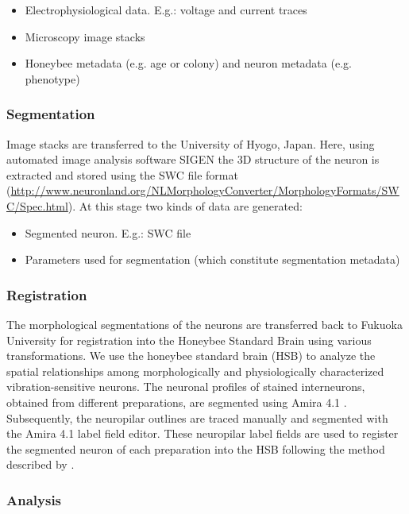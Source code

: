 \documentclass{frontiersSCNS} %
\begin{document}
\begin{itemize}
\item Electrophysiological data. E.g.: voltage and current traces
\item Microscopy image stacks
\item Honeybee metadata (e.g. age or colony) and neuron metadata (e.g.
    phenotype)
\end{itemize}

\subsubsection{Segmentation}

Image stacks are transferred to the University of Hyogo, Japan. Here, using
automated image analysis software SIGEN \citep{Yamasaki2006, Minemoto} the 3D
structure of the neuron is extracted and stored using the SWC file format
(\url{http://www.neuronland.org/NLMorphologyConverter/MorphologyFormats/SWC/Spec.html}).
At this stage two kinds of data are generated:

\begin{itemize}
\item Segmented neuron. E.g.: SWC file
\item Parameters used for segmentation (which constitute segmentation metadata)
\end{itemize}


\subsubsection{Registration}

The morphological segmentations of the neurons are transferred back to Fukuoka
University for registration into the Honeybee Standard Brain using various
transformations. We use the honeybee standard brain (HSB) to analyze the
spatial relationships among morphologically and physiologically characterized
vibration-sensitive neurons. The neuronal profiles of stained interneurons,
obtained from different preparations, are segmented  using Amira 4.1
\citep{Evers2005}. Subsequently, the neuropilar outlines are traced manually and
segmented with the Amira 4.1 label field editor. These neuropilar label fields
are used to register the segmented neuron of each preparation into the HSB
following the method described by \citet{Brandt2005}.


\subsubsection{Analysis}
\end{document}
